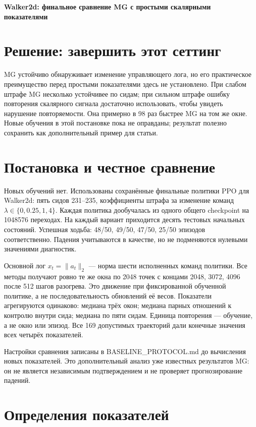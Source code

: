 \documentclass[10pt,a4paper]{article}
\begin{document}
{\Large\bfseries Walker2d: финальное сравнение MG с простыми скалярными показателями}\par\medskip

\section*{Решение: завершить этот сеттинг}

MG устойчиво обнаруживает изменение управляющего лога, но его практическое преимущество перед простыми показателями здесь не установлено. При слабом штрафе MG несколько устойчивее по сидам; при сильном штрафе ошибку повторения скалярного сигнала достаточно использовать, чтобы увидеть нарушение повторяемости. Она примерно в 98 раз быстрее MG на том же окне. Новые обучения в этой постановке пока не оправданы; результат полезно сохранить как дополнительный пример для статьи.

\section*{Постановка и честное сравнение}

Новых обучений нет. Использованы сохранённые финальные политики PPO для Walker2d: пять сидов 231--235, коэффициенты штрафа за изменение команд $\lambda\in\{0,0.25,1,4\}$. Каждая политика дообучалась из одного общего checkpoint на 1048576 переходах. На каждый вариант приходится десять тестовых начальных состояний. Успешная ходьба: 48/50, 49/50, 47/50, 25/50 эпизодов соответственно. Падения учитываются в качестве, но не подменяются нулевыми значениями диагностик.

Основной лог $x_t=\|a_t\|_2$ --- норма шести исполненных команд политики. Все методы получают ровно те же окна по 2048 точек с концами 2048, 3072, 4096 после 512 шагов разогрева. Это движение при фиксированной обученной политике, а не последовательность обновлений её весов. Показатели агрегируются одинаково: медиана трёх окон; медиана парных отношений к контролю внутри сида; медиана по пяти сидам. Единица повторения --- обучение, а не окно или эпизод. Все 169 допустимых траекторий дали конечные значения всех четырёх показателей.

Настройки сравнения записаны в BASELINE\_PROTOCOL.md до вычисления новых показателей. Это дополнительный анализ уже известных результатов MG: он не является независимым подтверждением и не проверяет прогнозирование падений.

\section*{Определения показателей}
\end{document}
